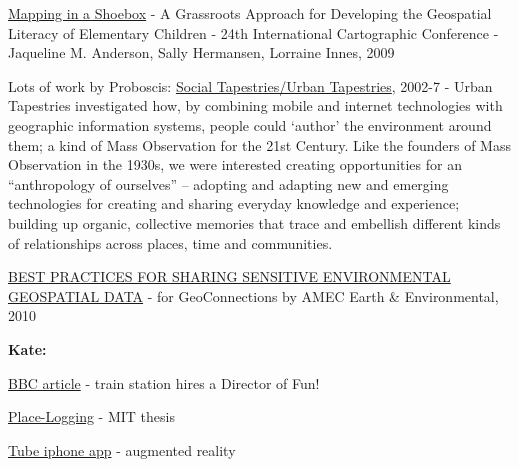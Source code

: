 \documentclass[11pt]{report}
\begin{document}
\href{http://training.esri.com/campus/library/bibliography/RecordDetail.cfm?ID=95545&browseonly=0}{Mapping in a Shoebox} - A Grassroots Approach for Developing the Geospatial Literacy of Elementary Children - 24th International Cartographic Conference - Jaqueline M. Anderson, Sally Hermansen, Lorraine Innes, 2009

Lots of work by Proboscis: \href{http://urbantapestries.net/}{Social Tapestries/Urban Tapestries}, 2002-7 - Urban Tapestries investigated how, by combining mobile and internet technologies with geographic information systems, people could `{}author'{} the environment around them; a kind of Mass Observation for the 21st Century. Like the founders of Mass Observation in the 1930s, we were interested creating opportunities for an ``{}anthropology of ourselves''{} – adopting and adapting new and emerging technologies for creating and sharing everyday knowledge and experience; building up organic, collective memories that trace and embellish different kinds of relationships across places, time and communities.

\href{http://www.geoconnections.org/publications/Key_documents/Sensitive_Env_Geo_Data_Guide_EN_v1.pdf}{BEST PRACTICES FOR SHARING SENSITIVE ENVIRONMENTAL GEOSPATIAL DATA} - for GeoConnections by AMEC Earth \& Environmental, 2010

\textbf{Kate:}

\href{http://news.bbc.co.uk/2/hi/uk_news/8216071.stm}{BBC article} - train station hires a Director of Fun!

\href{http://www.rajworks.com/index1.htm}{Place-Logging} - MIT thesis

\href{http://www.youtube.com/watch?v=U2uH-jrsSxs&feature=rec-LGOUT-exp_fresh+div-1r-3-HM}{Tube iphone app} - augmented reality
\end{document}
